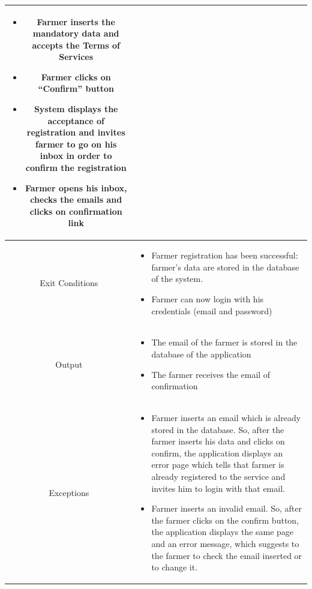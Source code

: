 \documentclass{article}
\begin{document}
\begin{center}
\begin{longtable}{|c| p{10cm}|}
\begin{itemize}
\begin{itemize}
                                \item Password
                                \item Farm’s name
                                \item Farm’s location
                            \end{itemize}
                        \item Farmer inserts the mandatory data and accepts the Terms of Services
                        \item Farmer clicks on “Confirm” button
                        \item System displays the acceptance of registration and invites farmer to go on his inbox in order to confirm the registration
                        \item Farmer opens his inbox, checks the emails and clicks on confirmation link
                    \end{itemize}\\
        \hline
        Exit Conditions & 
                    \begin{itemize}
                        \item Farmer registration has been successful: farmer’s data are stored in the database of the system. 
                        \item Farmer can now login with his credentials (email and password)
                    \end{itemize}\\
        \hline
            Output & 
                    \begin{itemize}
                        \item The email of the farmer is stored in the database of the application
                        \item The farmer receives the email of confirmation
                    \end{itemize}\\
        \hline
            Exceptions & 
                    \begin{itemize}
                        \item Farmer inserts an email which is already stored in the database. So, after the farmer inserts his data and clicks on confirm, the application displays an error page which tells that farmer is already registered to the service and invites him to login with that email.
                        \item Farmer inserts an invalid email. So, after the farmer clicks on the confirm button, the application displays the same page and an error message, which suggests to the farmer to check the email inserted or to change it.

\end{itemize}
\end{longtable}
\end{center}
\end{document}
